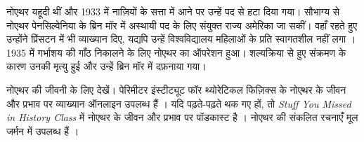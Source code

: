 \documentclass[../../../include/open-logic-section]{subfiles}
\begin{document}
नोएथर यहूदी थीं और 1933 में नाज़ियों के सत्ता में आने पर उन्हें पद से हटा
दिया गया। सौभाग्य से नोएथर पेनसिल्वेनिया के ब्रिन मॉर में अस्थायी पद के लिए
संयुक्त राज्य अमेरिका जा सकीं। वहाँ रहते हुए उन्होंने प्रिंसटन में भी
व्याख्यान दिए, यद्यपि उन्हें विश्वविद्यालय महिलाओं के प्रति स्वागतशील नहीं
लगा \citep[81]{Dick1981}। 1935 में गर्भाशय की गाँठ निकालने के लिए नोएथर का
ऑपरेशन हुआ। शल्यक्रिया से हुए संक्रमण के कारण उनकी मृत्यु हुई और उन्हें
ब्रिन मॉर में दफ़नाया गया।

\begin{reading} 
नोएथर की जीवनी के लिए \citet{Dick1981} देखें। पेरिमीटर इंस्टीट्यूट फॉर
थ्योरेटिकल फिज़िक्स के नोएथर के जीवन और प्रभाव पर व्याख्यान ऑनलाइन उपलब्ध
हैं \citep{Perimeter2015}। यदि पढ़ते-पढ़ते थक गए हों, तो \emph{Stuff You
Missed in History Class} में नोएथर के जीवन और प्रभाव पर पॉडकास्ट है
\citep{Frey2015}। नोएथर की संकलित रचनाएँ मूल जर्मन में उपलब्ध हैं
\citep{Noether1983}।
\end{reading}
\end{document}
